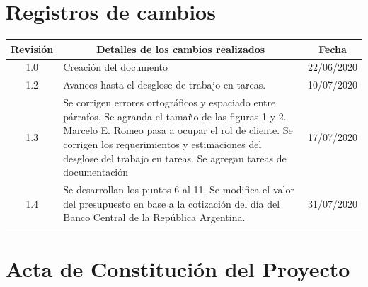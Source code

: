 \documentclass[11pt]{charter}
\begin{document}
\maketitle
\thispagestyle{empty}
\pagebreak


\thispagestyle{empty}
{\setlength{\parskip}{0pt}
\tableofcontents{}
}
\pagebreak


\section{Registros de cambios}
\label{sec:registro}


\begin{table}[ht]
\label{tab:registro}
\centering

\begin{tabularx}{\linewidth}{@{}|c|X|c|@{}}
\hline
\rowcolor[HTML]{C0C0C0} 
Revisión & \multicolumn{1}{c|}{\cellcolor[HTML]{C0C0C0}Detalles de los cambios realizados} & Fecha      \\ \hline
1.0      & Creación del documento                                                          & 22/06/2020 \\ \hline
1.2      & Avances hasta el desglose de trabajo en tareas.                                 & 10/07/2020 \\ \hline
1.3      & Se corrigen errores ortográficos y espaciado entre párrafos. \newline
	Se agranda el tamaño de las figuras 1 y 2.\newline
	Marcelo E. Romeo pasa a ocupar el rol de cliente.\newline
	Se corrigen los requerimientos y estimaciones del desglose del trabajo en tareas.\newline
	Se agregan tareas de documentación
& 17/07/2020 \\ \hline

1.4      & Se desarrollan los puntos 6 al 11.\newline
	Se modifica el valor del presupuesto en base a la cotización del día del Banco Central de la República Argentina.\newline
& 31/07/2020 \\ \hline
\end{tabularx}
\end{table}

\pagebreak



\section{Acta de Constitución del Proyecto}
\label{sec:acta}
\end{document}

